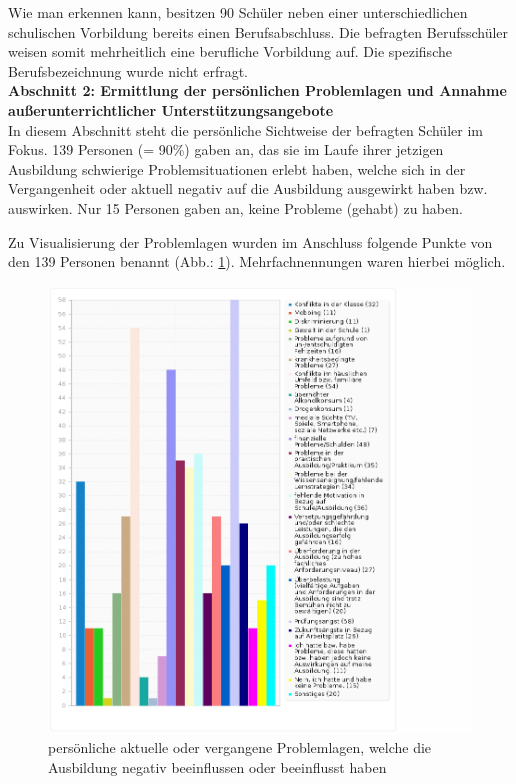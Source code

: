 \noindent
Wie man erkennen kann, besitzen 90 Schüler neben einer unterschiedlichen schulischen Vorbildung bereits einen Berufsabschluss. Die befragten Berufsschüler weisen somit mehrheitlich eine berufliche Vorbildung auf. Die spezifische Berufsbezeichnung wurde nicht erfragt.\\

\noindent
\textbf{Abschnitt 2: Ermittlung der persönlichen Problemlagen und Annahme außerunterrichtlicher Unterstützungsangebote}\\

\noindent
In diesem Abschnitt steht die persönliche Sichtweise der befragten Schüler im Fokus. 139 Personen (= 90\%) gaben an, das sie im Laufe ihrer jetzigen Ausbildung schwierige Problemsituationen erlebt haben, welche sich in der Vergangenheit oder aktuell negativ auf die Ausbildung ausgewirkt haben bzw. auswirken. Nur 15 Personen gaben an, keine Probleme (gehabt) zu haben. 

Zu Visualisierung der Problemlagen wurden im Anschluss folgende Punkte von den 139 Personen benannt (Abb.: \ref{fig:Aktuelle-oder-vergangene-Probleme-der-Schueler-welche-die-Ausbildung-negativ-beeinflussen-oder-negativ-beeinflusst-haben}). Mehrfachnennungen waren hierbei möglich.  

\begin{figure}[hp]
	\centering
		\includegraphics[width=1.0\textwidth]{images/Aktuelle-oder-vergangene-Probleme-der-Schueler-welche-die-Ausbildung-negativ-beeinflussen-oder-negativ-beeinflusst-haben.png}
	\caption{persönliche aktuelle oder vergangene Problemlagen, welche die Ausbildung negativ beeinflussen oder beeinflusst haben}
	\label{fig:Aktuelle-oder-vergangene-Probleme-der-Schueler-welche-die-Ausbildung-negativ-beeinflussen-oder-negativ-beeinflusst-haben}
\end{figure}

